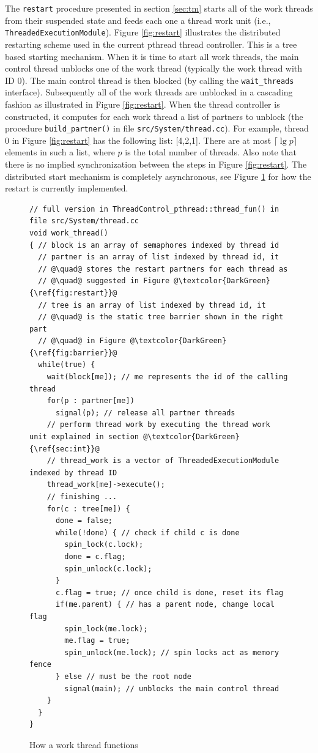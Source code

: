 \documentclass{article}
\begin{document}
The \lstinline{restart} procedure presented in section \ref{sec:tm}
starts all of the work threads from their suspended state and feeds each
one a thread work unit (i.e., \lstinline{ThreadedExecutionModule}).
Figure \ref{fig:restart} illustrates the distributed restarting scheme
used in the current pthread thread controller.  This is a tree based
starting mechanism.  When it is time to start all work threads, the main
control thread unblocks one of the work thread (typically the work
thread with ID 0).  The main control thread is then blocked (by calling
the \lstinline{wait_threads} interface).  Subsequently all of the work
threads are unblocked in a cascading fashion as illustrated in Figure
\ref{fig:restart}.  When the thread controller is constructed, it
computes for each work thread a list of partners to unblock (the
procedure \lstinline{build_partner()} in file
\texttt{src/System/thread.cc}).  For example, thread 0 in Figure
\ref{fig:restart} has the following list: [4,2,1].  There are at most
$\lceil\lg p\rceil$ elements in such a list, where $p$ is the total
number of threads.  Also note that there is no implied synchronization
between the steps in Figure \ref{fig:restart}.  The distributed start
mechanism is completely asynchronous, see Figure \ref{fig:wt} for how
the restart is currently implemented.

\begin{figure}%
  \begin{lstlisting}[escapechar=@]
// full version in ThreadControl_pthread::thread_fun() in file src/System/thread.cc
void work_thread()
{ // block is an array of semaphores indexed by thread id
  // partner is an array of list indexed by thread id, it
  // @\quad@ stores the restart partners for each thread as
  // @\quad@ suggested in Figure @\textcolor{DarkGreen}{\ref{fig:restart}}@
  // tree is an array of list indexed by thread id, it
  // @\quad@ is the static tree barrier shown in the right part
  // @\quad@ in Figure @\textcolor{DarkGreen}{\ref{fig:barrier}}@
  while(true) {
    wait(block[me]); // me represents the id of the calling thread
    for(p : partner[me]) 
      signal(p); // release all partner threads
    // perform thread work by executing the thread work unit explained in section @\textcolor{DarkGreen}{\ref{sec:int}}@
    // thread_work is a vector of ThreadedExecutionModule indexed by thread ID
    thread_work[me]->execute(); 
    // finishing ...
    for(c : tree[me]) {
      done = false;
      while(!done) { // check if child c is done
        spin_lock(c.lock);
        done = c.flag;
        spin_unlock(c.lock);
      }
      c.flag = true; // once child is done, reset its flag
      if(me.parent) { // has a parent node, change local flag
        spin_lock(me.lock);
        me.flag = true;
        spin_unlock(me.lock); // spin locks act as memory fence
      } else // must be the root node
        signal(main); // unblocks the main control thread
    }
  } 
}
  \end{lstlisting}
  \caption{How a work thread functions\label{fig:wt}}
\end{figure}
\end{document}
